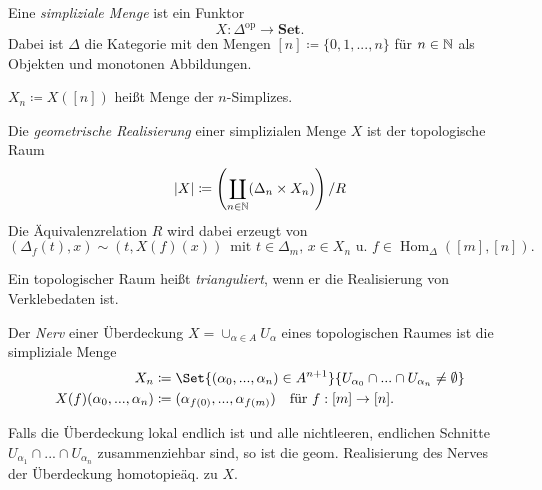 \documentclass{cheat-sheet}
\newcommand{\SetC}{\mathbf{Set}} %
\newcommand{\op}{\mathrm{op}} %
\DeclareMathOperator{\Hom}{Hom} %
\begin{document}


\begin{defn}
  Eine \emph{simpliziale Menge} ist ein Funktor
  \[ X : \Delta^\op \to \SetC. \]
  Dabei ist $\Delta$ die Kategorie mit den Mengen
  $[n] \coloneqq \{ 0, 1, ..., n \}$ für $n \in \mathbb{N}$ als Objekten und monotonen Abbildungen.
\end{defn}

\begin{nota}
  $X_n \coloneqq X([n])$ heißt Menge der $n$-Simplizes.
\end{nota}

\begin{defn}
  Die \emph{geometrische Realisierung} einer simplizialen Menge $X$ ist der topologische Raum
  \[ \lvert X\rvert \coloneqq \left( \coprod_{n \in \mathbb{N}} (\Delta_n \times X_{n}) \right) / R \]
  Die Äquivalenzrelation $R$ wird dabei erzeugt von
  \[
    (\Delta_f(t), x) \sim (t, X(f)(x)) \enspace
    \text{mit $t \in \Delta_m$, $x \in X_n$ u. $f \in \Hom_\Delta([m], [n])$.}
  \]
\end{defn}

\begin{defn}
  Ein topologischer Raum heißt \emph{trianguliert}, wenn er die Realisierung von Verklebedaten ist.
\end{defn}

\begin{defn}
  Der \emph{Nerv} einer Überdeckung $X = \cup_{\alpha \in A} U_\alpha$ eines topologischen Raumes ist die simpliziale Menge
  \begin{align*}
    X_n & \coloneqq \Set{(\alpha_0, ..., \alpha_n) \in A^{n+1}}{ U_{\alpha_0} \cap ... \cap U_{\alpha_n} \not= \emptyset } \\
    X(f)(\alpha_0, ..., \alpha_n) & \coloneqq (\alpha_{f(0)}, ..., \alpha_{f(m)}) \quad \text{für } f : [m] \to [n].
  \end{align*}
\end{defn}

\begin{bem}
  Falls die Überdeckung lokal endlich ist und alle nichtleeren, endlichen Schnitte $U_{\alpha_1} \cap ... \cap U_{\alpha_n}$ zusammenziehbar sind, so ist die geom. Realisierung des Nerves der Überdeckung homotopieäq. zu $X$.
\end{bem}
\end{document}
